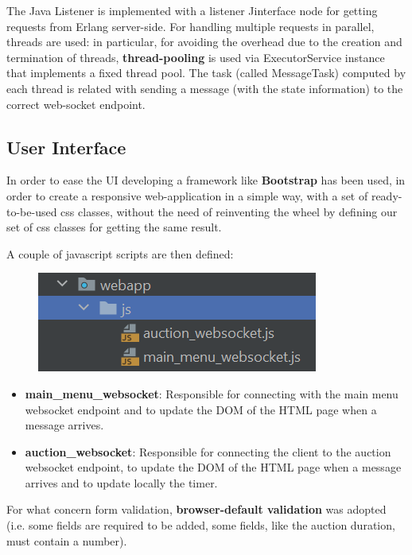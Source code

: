 The Java Listener is implemented with a listener Jinterface node for getting requests from Erlang server-side. For handling multiple requests in parallel, threads are used: in particular, for avoiding the overhead due to the creation and termination of threads, \textbf{thread-pooling} is used via ExecutorService instance that implements a fixed thread pool. The task (called MessageTask) computed by each thread is related with sending a message (with the state information) to the correct web-socket endpoint.

\subsection{User Interface} 
In order to ease the UI developing a framework like \textbf{Bootstrap} has been used, in order to create a responsive web-application in a simple way, with a set of ready-to-be-used css classes, without the need of reinventing the wheel by defining our set of css classes for getting the same result. 


A couple of javascript scripts are then defined:

\begin{figure}[H]
	\centering
	\includegraphics[width=0.4\linewidth]{img/js}
	\caption{}
	\label{fig:js}
\end{figure}

\begin{itemize}
	\item \textbf{main\_menu\_websocket}: Responsible for connecting with the main menu websocket endpoint and to update the DOM of the HTML page when a message arrives.
	\item \textbf{auction\_websocket}: Responsible for connecting the client to the auction websocket endpoint, to update the DOM of the HTML page when a message arrives and to update locally the timer.
\end{itemize}

For what concern form validation, \textbf{browser-default validation} was adopted (i.e. some fields are required to be added, some fields, like the auction duration,  must contain a number).